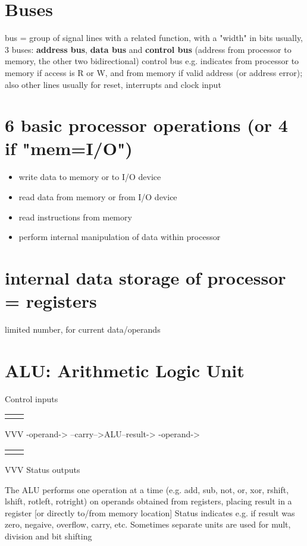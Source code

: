 \documentclass[11pt]{article}
\begin{document}
\section{Buses}
\label{sec:orgb47c24f}
bus = group of signal lines with a related function, with a "width" in bits
usually, 3 buses: \textbf{address bus}, \textbf{data bus} and \textbf{control bus}
(address from processor to memory, the other two bidirectional)
control bus e.g. indicates from processor to memory if access is R or W,
and from memory if valid address (or address error); also other lines usually
for reset, interrupts and clock input
\section{6 basic processor operations (or 4 if "mem=I/O")}
\label{sec:orge3dc68f}
\begin{itemize}
\item write data to memory or to I/O device
\item read data from memory or from I/O device
\item read instructions from memory
\item perform internal manipulation of data within processor
\end{itemize}
\section{internal data storage of processor = registers}
\label{sec:org15fe2c9}
limited number, for current data/operands
\section{ALU: Arithmetic Logic Unit}
\label{sec:org52bc62d}
Control inputs
\begin{center}
\begin{tabular}{ll}
 & \\
\end{tabular}
\end{center}
          VVV
-operand->
--carry-->ALU--result->
-operand->
\begin{center}
\begin{tabular}{ll}
 & \\
\end{tabular}
\end{center}
     VVV
Status outputs

The ALU performs one operation at a time (e.g. add, sub, not, or, xor, rshift,
lshift, rotleft, rotright) on operands obtained from registers, placing result
in a register [or directly to/from memory location]
Status indicates e.g. if result was zero, negaive, overflow, carry, etc.
Sometimes separate units are used for mult, division and bit shifting
\end{document}
